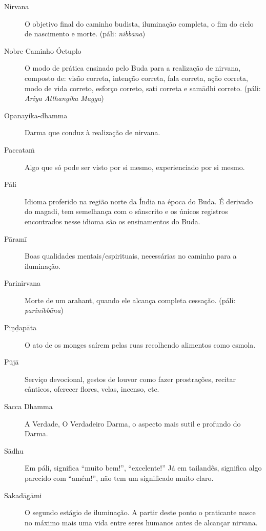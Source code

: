 \begin{description}
  \item[Nirvana] O objetivo final do caminho budista, iluminação completa, o fim do ciclo de nascimento e morte. (páli: \emph{nibbāna})

  \item[Nobre Caminho Óctuplo] O modo de prática ensinado pelo Buda para a realização de nirvana, composto de: visão correta, intenção correta, fala correta, ação correta, modo de vida correto, esforço correto, sati correta e samādhi correto. (páli: \emph{Ariya Atthangika Magga})

  \item[Opanayika-dhamma] Darma que conduz à realização de nirvana.

  \item[Paccataṁ] Algo que só pode ser visto por si mesmo, experienciado por si mesmo.

  \item[Páli] Idioma proferido na região norte da Índia na época do Buda. É derivado do magadi, tem semelhança com o sânscrito e os únicos registros encontrados nesse idioma são os ensinamentos do Buda.

  \item[Pāramī] Boas qualidades mentais/espirituais, necessárias no caminho para a iluminação.

  \item[Parinirvana] Morte de um arahant, quando ele alcança completa cessação. (páli: \emph{parinibbāna})

  \item[Piṇḍapāta] O ato de os monges saírem pelas ruas recolhendo alimentos como esmola.

  \item[Pūjā] Serviço devocional, gestos de louvor como fazer prostrações, recitar cânticos, oferecer flores, velas, incenso, etc.

  \item[Sacca Dhamma] A Verdade, O Verdadeiro Darma, o aspecto mais sutil e profundo do Darma.

  \item[Sādhu] Em páli, significa “muito bem!”, “excelente!” Já em tailandês, significa algo parecido com “amém!”, não tem um significado muito claro.

  \item[Sakadāgāmi] O segundo estágio de iluminação. A partir deste ponto o praticante nasce no máximo mais uma vida entre seres humanos antes de alcançar nirvana.


\end{description}
